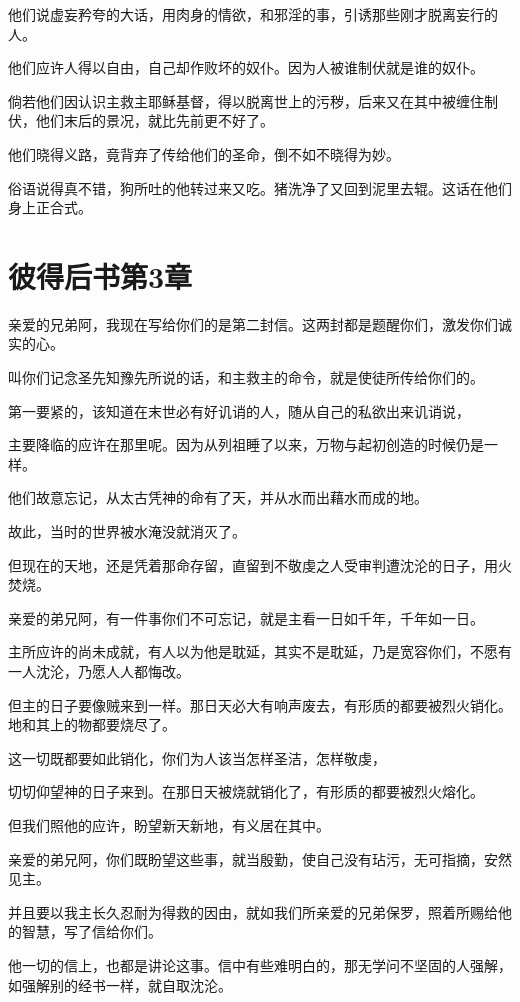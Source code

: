 \documentclass[12pt,oneside]{book}
\begin{document}
他们说虚妄矜夸的大话，用肉身的情欲，和邪淫的事，引诱那些刚才脱离妄行的人。

他们应许人得以自由，自己却作败坏的奴仆。因为人被谁制伏就是谁的奴仆。

倘若他们因认识主救主耶稣基督，得以脱离世上的污秽，后来又在其中被缠住制伏，他们末后的景况，就比先前更不好了。

他们晓得义路，竟背弃了传给他们的圣命，倒不如不晓得为妙。

俗语说得真不错，狗所吐的他转过来又吃。猪洗净了又回到泥里去辊。这话在他们身上正合式。

\chapter{彼得后书第3章}
亲爱的兄弟阿，我现在写给你们的是第二封信。这两封都是题醒你们，激发你们诚实的心。

叫你们记念圣先知豫先所说的话，和主救主的命令，就是使徒所传给你们的。

第一要紧的，该知道在末世必有好讥诮的人，随从自己的私欲出来讥诮说，

主要降临的应许在那里呢。因为从列祖睡了以来，万物与起初创造的时候仍是一样。

他们故意忘记，从太古凭神的命有了天，并从水而出藉水而成的地。

故此，当时的世界被水淹没就消灭了。

但现在的天地，还是凭着那命存留，直留到不敬虔之人受审判遭沈沦的日子，用火焚烧。

亲爱的弟兄阿，有一件事你们不可忘记，就是主看一日如千年，千年如一日。

主所应许的尚未成就，有人以为他是耽延，其实不是耽延，乃是宽容你们，不愿有一人沈沦，乃愿人人都悔改。

但主的日子要像贼来到一样。那日天必大有响声废去，有形质的都要被烈火销化。地和其上的物都要烧尽了。

这一切既都要如此销化，你们为人该当怎样圣洁，怎样敬虔，

切切仰望神的日子来到。在那日天被烧就销化了，有形质的都要被烈火熔化。

但我们照他的应许，盼望新天新地，有义居在其中。

亲爱的弟兄阿，你们既盼望这些事，就当殷勤，使自己没有玷污，无可指摘，安然见主。

并且要以我主长久忍耐为得救的因由，就如我们所亲爱的兄弟保罗，照着所赐给他的智慧，写了信给你们。

他一切的信上，也都是讲论这事。信中有些难明白的，那无学问不坚固的人强解，如强解别的经书一样，就自取沈沦。
\end{document}
